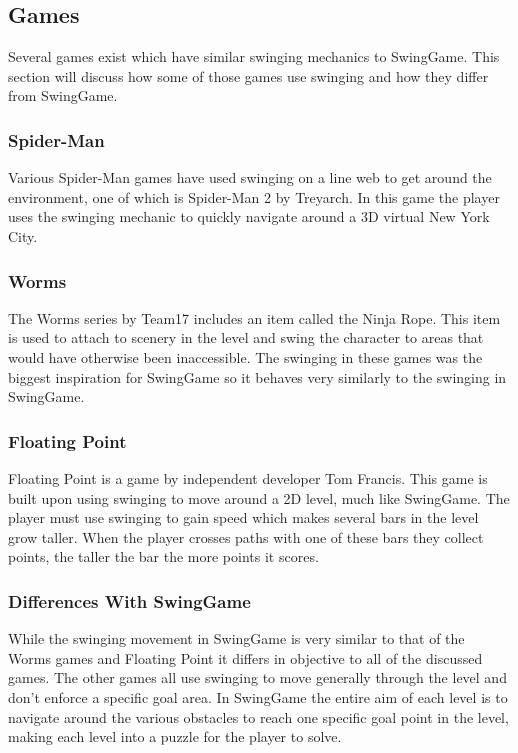 \documentclass[]{report}
\begin{document}
		\subsection{Games}
		Several games exist which have similar swinging mechanics to SwingGame. This section will discuss how some of those games use swinging and how they differ from SwingGame.
			\subsubsection{Spider-Man}
			Various Spider-Man games have used swinging on a line web to get around the environment, one of which is Spider-Man 2\cite{spiderman} by Treyarch. In this game the player uses the swinging mechanic to quickly navigate around a 3D virtual New York City.
			\subsubsection{Worms}
			The Worms\cite{worms} series by Team17 includes an item called the Ninja Rope. This item is used to attach to scenery in the level and swing the character to areas that would have otherwise been inaccessible. The swinging in these games was the biggest inspiration for SwingGame so it behaves very similarly to the swinging in SwingGame.
			\subsubsection{Floating Point}
			Floating Point\cite{floatingpoint} is a game by independent developer Tom Francis. This game is built upon using swinging to move around a 2D level, much like SwingGame. The player must use swinging to gain speed which makes several bars in the level grow taller. When the player crosses paths with one of these bars they collect points, the taller the bar the more points it scores.
			\subsubsection{Differences With SwingGame}
			While the swinging movement in SwingGame is very similar to that of the Worms games and Floating Point it differs in objective to all of the discussed games. The other games all use swinging to move generally through the level and don't enforce a specific goal area. In SwingGame the entire aim of each level is to navigate around the various obstacles to reach one specific goal point in the level, making each level into a puzzle for the player to solve.
\end{document}
